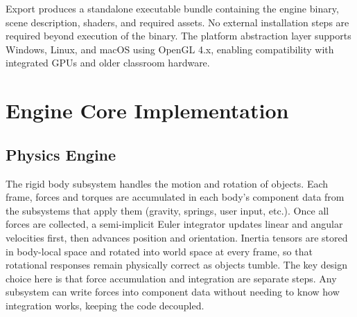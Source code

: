 \documentclass[9pt,openany]{extbook}
\begin{document}
Export produces a standalone executable bundle containing the engine binary, scene description, shaders, and required assets. No external installation steps are required beyond execution of the binary. The platform abstraction layer supports Windows, Linux, and macOS using OpenGL 4.x, enabling compatibility with integrated GPUs and older classroom hardware.




\usetikzlibrary{arrows.meta, shapes.geometric, fit, backgrounds,
                positioning, calc, decorations.pathreplacing}



\chapter{Engine Core Implementation}

\section{Physics Engine}

The rigid body subsystem handles the motion and rotation of objects. Each frame, forces and torques are accumulated in each body's component data from the subsystems that apply them (gravity, springs, user input, etc.). Once all forces are collected, a semi-implicit Euler integrator updates linear and angular velocities first, then advances position and orientation. Inertia tensors are stored in body-local space and rotated into world space at every frame, so that rotational responses remain physically correct as objects tumble. The key design choice here is that force accumulation and integration are separate steps. Any subsystem can write forces into component data without needing to know how integration works, keeping the code decoupled.
\end{document}
